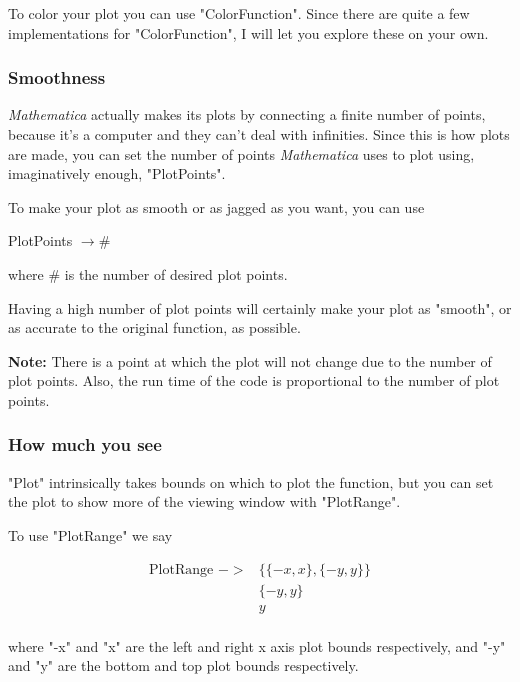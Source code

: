 \documentclass[11pt,a4paper,twoside]{article}
\begin{document}
					To color your plot you can use "ColorFunction".  Since there are quite a few implementations for "ColorFunction", I will let you explore these on your own.
						
				\subsubsection{Smoothness}
						
					\textit{Mathematica} actually makes its plots by connecting a finite number of points, because it's a computer and they can't deal with infinities.  Since this is how plots are made, you can set the number of points \textit{Mathematica} uses to plot using, imaginatively enough, "PlotPoints".
						
					To make your plot as smooth or as jagged as you want, you can use
						
					\begin{center} PlotPoints $ \rightarrow \# $ \end{center}
						
					where $ \# $ is the number of desired plot points.
						
					Having a high number of plot points will certainly make your plot as "smooth", or as accurate to the original function, as possible.
						
					\textbf{Note:} There is a point at which the plot will not change due to the number of plot points.  Also, the run time of the code is proportional to the number of plot points.
						
				\subsubsection{How much you see}
						
					"Plot" intrinsically takes bounds on which to plot the function, but you can set the plot to show more of the viewing window with "PlotRange".
						
					To use "PlotRange" we say
						
					\begin{align*}
						\text{PlotRange } ->& \{ \{ -x,x \} , \{ -y,y \} \} \\
											& \{ -y,y \} \\
											& y \\
					\end{align*}
						
					where "-x" and "x" are the left and right x axis plot bounds respectively, and "-y" and "y" are the bottom and top plot bounds respectively.
						
\end{document}
